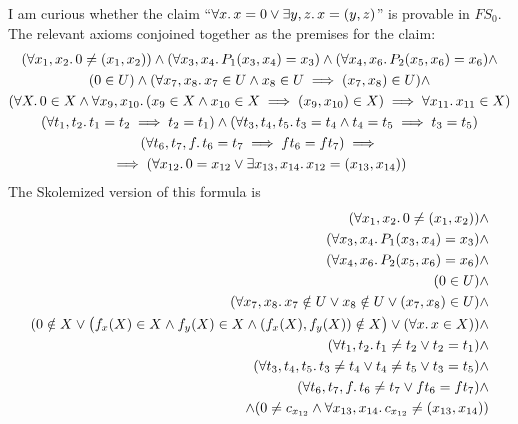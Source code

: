\begin{node}
I am curious whether the claim ``$\forall x\ldotp x=0\lor\exists
y,z\ldotp x=(y,z)$'' is provable in $FS_{0}$. The relevant axioms
conjoined together as the premises for the claim:
\begin{multline*}
(\forall x_{1},x_{2}\ldotp 0\neq(x_{1},x_{2}))\land
(\forall x_{3},x_{4}\ldotp P_{1}(x_{3},x_{4})=x_{3})\land
(\forall x_{4},x_{6}\ldotp P_{2}(x_{5},x_{6})=x_{6})\land\\
(0\in U)\land(\forall x_{7},x_{8}\ldotp x_{7}\in U\land x_{8}\in U\implies (x_{7},x_{8})\in U)\land\\
(\forall X\ldotp 0\in X\land\forall x_{9},x_{10}\ldotp(x_{9}\in X\land x_{10}\in X\implies(x_{9},x_{10})\in X)\implies\forall x_{11}\ldotp x_{11}\in X)\\
(\forall t_{1},t_{2}\ldotp t_{1}=t_{2}\implies t_{2}=t_{1})\land(\forall t_{3},t_{4},t_{5}\ldotp t_{3}=t_{4}\land t_{4}=t_{5}\implies t_{3}=t_{5})\\
(\forall t_{6},t_{7},f\ldotp t_{6}=t_{7}\implies ft_{6}=ft_{7})\implies\\
  \implies(\forall x_{12}\ldotp 0=x_{12}\lor\exists x_{13},x_{14}\ldotp x_{12}=(x_{13},x_{14}))
\end{multline*}
The Skolemized version of this formula is
\begin{align*}
(\forall x_{1},x_{2}\ldotp 0\neq(x_{1},x_{2}))\land\\
(\forall x_{3},x_{4}\ldotp P_{1}(x_{3},x_{4})=x_{3})\land\\
(\forall x_{4},x_{6}\ldotp P_{2}(x_{5},x_{6})=x_{6})\land\\
(0\in U)\land\\
  (\forall x_{7},x_{8}\ldotp x_{7}\notin U\lor x_{8}\notin U\lor(x_{7},x_{8})\in U)\land\\
(0\notin X\lor\bigl(f_{x}(X)\in X\land f_{y}(X)\in X\land(f_{x}(X),f_{y}(X))\notin X\bigr)\lor(\forall x\ldotp x\in X))\land\\
  (\forall t_{1},t_{2}\ldotp t_{1}\neq t_{2}\lor t_{2}=t_{1})\land\\
  (\forall t_{3},t_{4},t_{5}\ldotp t_{3}\neq t_{4}\lor t_{4}\neq t_{5}\lor t_{3}=t_{5})\land\\
(\forall t_{6},t_{7},f\ldotp t_{6}\neq t_{7}\lor ft_{6}=ft_{7})\land\\
  \land(0\neq c_{x_{12}}\land\forall x_{13},x_{14}\ldotp c_{x_{12}}\neq(x_{13},x_{14}))
\end{align*}




\end{node}
